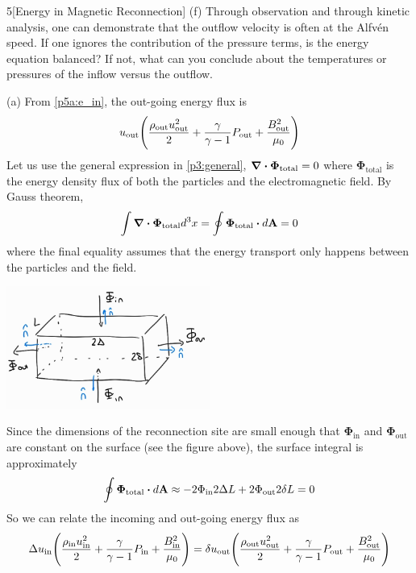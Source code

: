 \documentclass[12pt]{article}
\begin{document}
\begin{problem}{5}[Energy in Magnetic Reconnection]
(f) Through observation and through kinetic analysis, one can demonstrate that
the outflow velocity is often at the Alfvén speed. If one ignores the
contribution of the pressure terms, is the energy equation balanced? If not,
what can you conclude about the temperatures or pressures of the inflow versus
the outflow.
\begin{solution}
(a) From \eqref{p5a:e_in}, the out-going energy flux is
\begin{equation}
    u_{\text{out}}\qty(\frac{\rho_{\text{out}}u_{\text{out}}^2}{2}
    +\frac{\gamma}{\gamma-1}P_{\text{out}}+\frac{B_{\text{out}}^2}{\mu_0})    
\end{equation}
Let us use the general expression in \eqref{p3:general},
$\div{\vb{\bm\Phi_\text{total}}}=0$ where $\bm\Phi_\text{total}$ is the energy
density flux of both the particles and the electromagnetic field. By Gauss
theorem,
\begin{equation}
    \int \div{\bm\Phi_\text{total}}d^3x=\oint \bm\Phi_\text{total}\vdot d\vb{A}=0 
\end{equation}
where the final equality assumes that the energy transport only happens between
the particles and the field.
\begin{center}
    \includegraphics[width=0.5\textwidth]{hw5_p5.jpg} 
\end{center}
Since the dimensions of the reconnection site are
small enough that $\bm\Phi_\text{in}$ and $\bm\Phi_\text{out}$ are constant on
the surface (see the figure above), the surface integral is approximately
\begin{align}
    \oint\bm\Phi_\text{total}\vdot d\vb{A}
    \approx-2\Phi_\text{in} 2\Delta L+2\Phi_\text{out} 2\delta L=0
\end{align}
So we can relate the incoming and out-going energy flux as
\begin{equation}\label{p5a:energy}
    \Delta u_\text{in}
    \qty(\frac{\rho_\text{in}u_\text{in}^2}{2}+\frac{\gamma}{\gamma-1}P_\text{in}+\frac{B_\text{in}^2}{\mu_0})
    =
    \delta u_\text{out}
    \qty(\frac{\rho_\text{out}u_\text{out}^2}{2}+\frac{\gamma}{\gamma-1}P_\text{out}+\frac{B_\text{out}^2}{\mu_0})
\end{equation}


\end{solution}
\end{problem}
\end{document}
